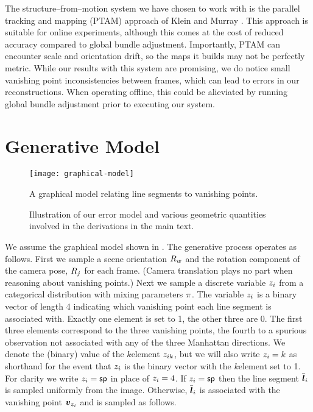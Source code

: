 The structure--from--motion system we have chosen to work with is the
parallel tracking and mapping (PTAM) approach of Klein and Murray
\cite{Klein07}. This approach is suitable for online experiments,
although this comes at the cost of reduced accuracy compared to global
bundle adjustment. Importantly, PTAM can encounter scale and
orientation drift, so the maps it builds may not be perfectly
metric. While our results with this system are promising, we do notice
small vanishing point inconsistencies between frames, which can lead
to errors in our reconstructions. When operating offline, this could
be alieviated by running global bundle adjustment prior to executing
our system.\changedsinceviva

\section{Generative Model}

\begin{figure}[tb]
  \centering
  \texttt{[image: graphical-model]}
  \caption{A graphical model relating line segments to vanishing
    points.}
  \label{fig:R-graphical}
\end{figure}

\begin{figure}[tb]
  \centering
  \qquad
  \caption{Illustration of our error model and various geometric
    quantities involved in the derivations in the main text.}
  \label{fig:line-model}
\end{figure}

We assume the graphical model shown in . The
generative process operates as follows. First we sample a scene
orientation $\SceneR$ and the rotation component of the camera pose,
$\CamR_j$ for each frame. (Camera translation plays no part when
reasoning about vanishing points.) Next we sample a discrete variable
$\Indicator_i$ from a categorical distribution with mixing parameters
$\Mixing$. The variable $\Indicator_i$ is a binary vector of length 4
indicating which vanishing point each line segment is associated
with. Exactly one element is set to 1, the other three are 0. The
first three elements correspond to the three vanishing points, the
fourth to a spurious observation not associated
with any of the three Manhattan directions. We denote the (binary)
value of the $k$\th element $\Indicator_{ik}$, but we will also write
$\Indicator_i=k$ as shorthand for the event that $\Indicator_i$ is the
binary vector with the $k$\th element set to 1. For clarity we write
$\Indicator_i=\Spurious$ in place of $\Indicator_i=4$. If
$\Indicator_i=\Spurious$ then the line segment $\TrueSeg_i$ is
sampled uniformly from the image. Otherwise, $\TrueSeg_i$ is
associated with the vanishing point $\vpt_{\Indicator_i}$ and is
sampled as follows.

